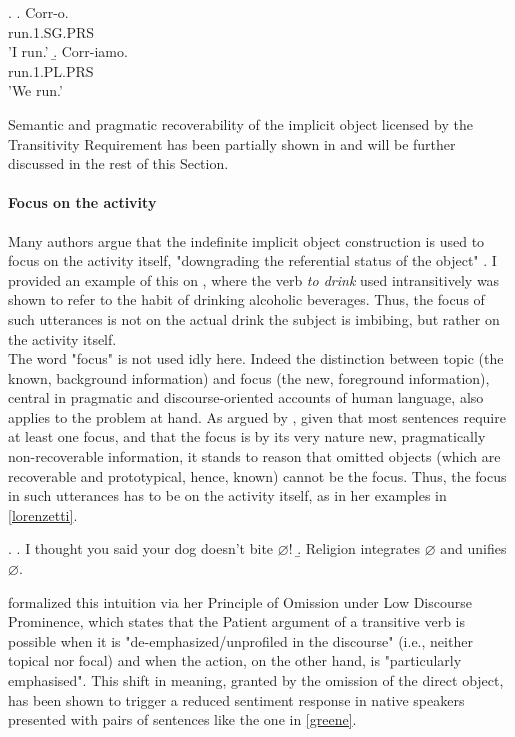 \ex. \label{epp_intro} \a. \label{epp_intro1} Corr-o. \\ run.1.SG.PRS \\ 'I run.'
\b. \label{epp_intro2} Corr-iamo. \\ run.1.PL.PRS \\ 'We run.'

Semantic and pragmatic recoverability of the implicit object licensed by the Transitivity Requirement has been partially shown in  and will be further discussed in the rest of this Section.


\paragraph{Focus on the activity} 

Many authors \parencite{Liu2008, Garcia-VelascoMunoz2002, Fillmore1986, Ahringberg2015, Levin1993, Yasutake1987, Goldberg2005} argue that the indefinite implicit object construction is used to focus on the activity itself, "downgrading the referential status of the object" \parencite[7-8]{Garcia-VelascoMunoz2002}. I provided an example of this on , where the verb \textit{to drink} used intransitively was shown to refer to the habit of drinking alcoholic beverages. Thus, the focus of such utterances is not on the actual drink the subject is imbibing, but rather on the activity itself.\\
The word "focus" is not used idly here. Indeed the distinction between topic (the known, background information) and focus (the new, foreground information), central in pragmatic and discourse-oriented accounts of human language, also applies to the problem at hand. As argued by \textcite[66]{Lorenzetti2008}, given that most sentences require at least one focus, and that the focus is by its very nature new, pragmatically non-recoverable information, it stands to reason that omitted objects (which are recoverable and prototypical, hence, known) cannot be the focus. Thus, the focus in such utterances has to be on the activity itself, as in her examples in \ref{lorenzetti}.

\ex. \label{lorenzetti} \a. \label{lorenzetti1} I thought you said your dog doesn’t bite $\varnothing$!
\b. \label{lorenzetti2} Religion integrates $\varnothing$ and unifies $\varnothing$.

\textcite{Goldberg2005} formalized this intuition via her Principle of Omission under Low Discourse Prominence, which states that the Patient argument of a transitive verb is possible when it is "de-emphasized/unprofiled in the discourse" (i.e., neither topical nor focal) and when the action, on the other hand, is "particularly emphasised". This shift in meaning, granted by the omission of the direct object, has been shown \parencite[507]{GreeneResnik2009more} to trigger a reduced sentiment response in native speakers presented with pairs of sentences like the one in \ref{greene}.

